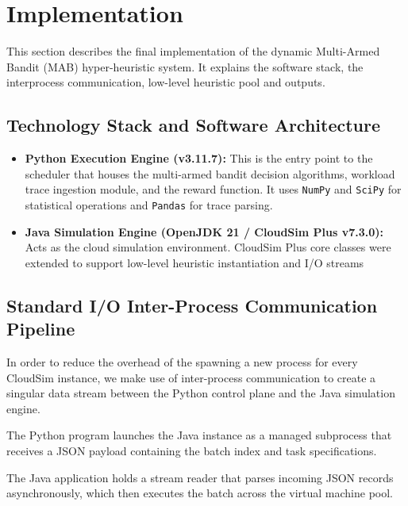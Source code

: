 
\section{Implementation}
\label{sec:Implementation}

This section describes the final implementation of the dynamic Multi-Armed Bandit (MAB) hyper-heuristic system. It explains the software stack, the interprocess communication, low-level heuristic pool and outputs.

\subsection{Technology Stack and Software Architecture}
\begin{itemize}
    \item \textbf{Python Execution Engine (v3.11.7):} This is the entry point to the scheduler that houses the multi-armed bandit decision algorithms, workload trace ingestion module, and the reward function. It uses \texttt{NumPy} and \texttt{SciPy} for statistical operations and \texttt{Pandas} for trace parsing.
    \item \textbf{Java Simulation Engine (OpenJDK 21 / CloudSim Plus v7.3.0):} Acts as the cloud simulation environment. CloudSim Plus core classes were extended to support low-level heuristic instantiation and I/O streams
\end{itemize}

\subsection{Standard I/O Inter-Process Communication Pipeline}
In order to reduce the overhead of the spawning a new process for every CloudSim instance, we make use of inter-process communication to create a singular data stream between the Python control plane and the Java simulation engine.

The Python program launches the Java instance as a managed subprocess that receives a JSON payload containing the batch index and task specifications.

The Java application holds a stream reader that parses incoming JSON records asynchronously, which then executes the batch across the virtual machine pool.

